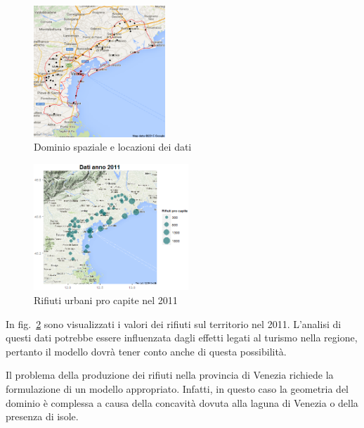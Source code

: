 \documentclass[a4paper,11pt,twoside,openright]{book}							%
\begin{document}
\begin{figure}[h]
	\centering
	\includegraphics[width=0.44\textwidth]{Immagini/Ven_punti.png}   
   	\caption{Dominio spaziale e locazioni dei dati}
	\label{fig:intro}
\end{figure}
\newpage
\begin{figure}[t]
	\centering
	\includegraphics[width=0.52\textwidth]{Immagini/venezia_dati/Dati2011.png}
   \caption{Rifiuti urbani pro capite nel 2011}
	\label{fig:intro2}
\end{figure}
In fig.~\ref{fig:intro2} sono visualizzati i valori dei rifiuti sul territorio nel 2011. L'analisi di questi dati potrebbe essere influenzata dagli effetti legati al turismo nella regione, pertanto il modello dovrà tener conto anche di questa possibilità.

Il problema della produzione dei rifiuti nella provincia di Venezia richiede la formulazione di un modello appropriato. Infatti, in questo caso la geometria del dominio è complessa a causa della concavità dovuta alla laguna di Venezia o della presenza di isole. 
\end{document}
